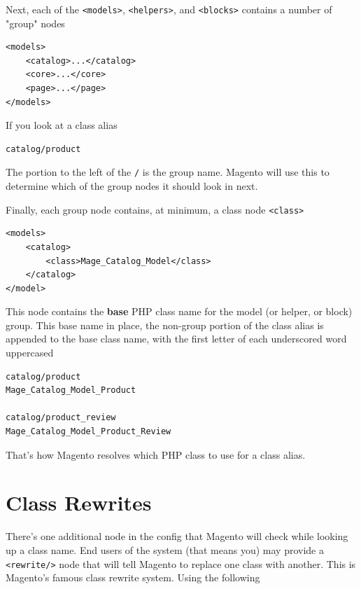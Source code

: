 \documentclass[oneside]{book}
\begin{document}
Next, each of the \footnotesize\texttt{\textless models\textgreater }\normalsize, \footnotesize\texttt{\textless helpers\textgreater }\normalsize, and \footnotesize\texttt{\textless blocks\textgreater } \normalsize  contains a number of "group" nodes

\begin{lstlisting}
<models>
    <catalog>...</catalog>
    <core>...</core>
    <page>...</page>
</models>

\end{lstlisting}


If you look at a class alias

\begin{lstlisting}
catalog/product

\end{lstlisting}


The portion to the left of the \footnotesize\texttt{/} \normalsize  is the group name. Magento will use this to determine which of the group nodes it should look in next.

Finally, each group node contains, at minimum, a class node \footnotesize\texttt{\textless class\textgreater } \normalsize 

\begin{lstlisting}
<models>
    <catalog>
        <class>Mage_Catalog_Model</class>        
    </catalog>  
</model>

\end{lstlisting}


This node contains the \textbf{base} PHP class name for the model (or helper, or block) group.  This base name in place, the non-group portion of the class alias is appended to the base class name, with the first letter of each underscored word uppercased

\begin{lstlisting}
catalog/product
Mage_Catalog_Model_Product

catalog/product_review
Mage_Catalog_Model_Product_Review

\end{lstlisting}


That's how Magento resolves which PHP class to use for a class alias.  

\section{Class Rewrites}

There's one additional node in the config that Magento will check while looking up a class name.  End users of the system (that means you) may provide a \footnotesize\texttt{\textless rewrite/\textgreater } \normalsize  node that will tell Magento to replace one class with another.  This is Magento's famous class rewrite system.  Using the following
\end{document}
